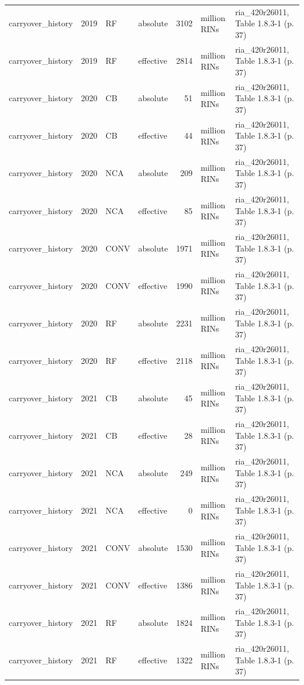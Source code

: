 \begin{longtable}{p{2.3cm}p{0.7cm}p{1.0cm}p{2.6cm}rp{1.7cm}p{4.6cm}}
carryover\_history & 2019 & RF & absolute & 3102 & million RINs & ria\_420r26011, Table 1.8.3-1 (p. 37) \\
carryover\_history & 2019 & RF & effective & 2814 & million RINs & ria\_420r26011, Table 1.8.3-1 (p. 37) \\
carryover\_history & 2020 & CB & absolute & 51 & million RINs & ria\_420r26011, Table 1.8.3-1 (p. 37) \\
carryover\_history & 2020 & CB & effective & 44 & million RINs & ria\_420r26011, Table 1.8.3-1 (p. 37) \\
carryover\_history & 2020 & NCA & absolute & 209 & million RINs & ria\_420r26011, Table 1.8.3-1 (p. 37) \\
carryover\_history & 2020 & NCA & effective & 85 & million RINs & ria\_420r26011, Table 1.8.3-1 (p. 37) \\
carryover\_history & 2020 & CONV & absolute & 1971 & million RINs & ria\_420r26011, Table 1.8.3-1 (p. 37) \\
carryover\_history & 2020 & CONV & effective & 1990 & million RINs & ria\_420r26011, Table 1.8.3-1 (p. 37) \\
carryover\_history & 2020 & RF & absolute & 2231 & million RINs & ria\_420r26011, Table 1.8.3-1 (p. 37) \\
carryover\_history & 2020 & RF & effective & 2118 & million RINs & ria\_420r26011, Table 1.8.3-1 (p. 37) \\
carryover\_history & 2021 & CB & absolute & 45 & million RINs & ria\_420r26011, Table 1.8.3-1 (p. 37) \\
carryover\_history & 2021 & CB & effective & 28 & million RINs & ria\_420r26011, Table 1.8.3-1 (p. 37) \\
carryover\_history & 2021 & NCA & absolute & 249 & million RINs & ria\_420r26011, Table 1.8.3-1 (p. 37) \\
carryover\_history & 2021 & NCA & effective & 0 & million RINs & ria\_420r26011, Table 1.8.3-1 (p. 37) \\
carryover\_history & 2021 & CONV & absolute & 1530 & million RINs & ria\_420r26011, Table 1.8.3-1 (p. 37) \\
carryover\_history & 2021 & CONV & effective & 1386 & million RINs & ria\_420r26011, Table 1.8.3-1 (p. 37) \\
carryover\_history & 2021 & RF & absolute & 1824 & million RINs & ria\_420r26011, Table 1.8.3-1 (p. 37) \\
carryover\_history & 2021 & RF & effective & 1322 & million RINs & ria\_420r26011, Table 1.8.3-1 (p. 37) \\

\end{longtable}
